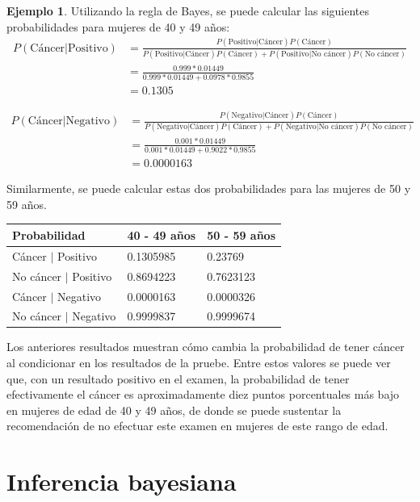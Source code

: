 \documentclass[
  10pt,
  spanish,
]{book}
\theoremstyle{definition}
\theoremstyle{definition}
\newtheorem{example}{Ejemplo}[chapter]
\theoremstyle{definition}
\theoremstyle{definition}
\theoremstyle{remark}
\begin{document}
\begin{example}
Utilizando la regla de Bayes, se puede calcular las siguientes probabilidades para mujeres de 40 y 49 años:
\begin{align*}
P(\text{Cáncer}|\text{Positivo})&=\frac{P(\text{Positivo}|\text{Cáncer})P(\text{Cáncer})}{P(\text{Positivo}|\text{Cáncer})P(\text{Cáncer})+P(\text{Positivo}|\text{No cáncer})P(\text{No cáncer})}\\
&=\frac{0.999*0.01449}{0.999*0.01449+0.0978*0.9855}\\
&=0.1305
\end{align*}

\begin{align*}
P(\text{Cáncer}|\text{Negativo})&=\frac{P(\text{Negativo}|\text{Cáncer})P(\text{Cáncer})}{P(\text{Negativo}|\text{Cáncer})P(\text{Cáncer})+P(\text{Negativo}|\text{No cáncer})P(\text{No cáncer})}\\
&=\frac{0.001*0.01449}{0.001*0.01449+0.9022*0.9855}\\
&=0.0000163
\end{align*}

Similarmente, se puede calcular estas dos probabilidades para las mujeres de 50 y 59 años.

\begin{longtable}[]{@{}lll@{}}
\toprule
Probabilidad & 40 - 49 años & 50 - 59 años \\
\midrule
\endhead
Cáncer \(\mid\) Positivo & 0.1305985 & 0.23769 \\
No cáncer \(\mid\) Positivo & 0.8694223 & 0.7623123 \\
Cáncer \(\mid\) Negativo & 0.0000163 & 0.0000326 \\
No cáncer \(\mid\) Negativo & 0.9999837 & 0.9999674 \\
\bottomrule
\end{longtable}

Los anteriores resultados muestran cómo cambia la probabilidad de tener cáncer al condicionar en los resultados de la pruebe. Entre estos valores se puede ver que, con un resultado positivo en el examen, la probabilidad de tener efectivamente el cáncer es aproximadamente diez puntos porcentuales más bajo en mujeres de edad de 40 y 49 años, de donde se puede sustentar la recomendación de no efectuar este examen en mujeres de este rango de edad.
\end{example}

\hypertarget{inferencia-bayesiana}{%
\chapter{Inferencia bayesiana}\label{inferencia-bayesiana}}
\end{document}
